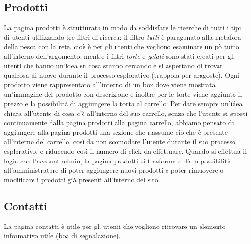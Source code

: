     \subsection{Prodotti}
		La pagina prodotti è strutturata in modo da soddisfare le ricerche di tutti i tipi di utenti utilizzando tre filtri di ricerca:
		il filtro \emph{tutti} è paragonato alla metafora della pesca con la rete, cioè è per gli utenti che vogliono esaminare un pò tutto all’interno dell’argomento;
		mentre i filtri \emph{torte} e \emph{gelati}  sono stati creati per gli utenti che hanno un’idea su cosa stanno cercando e si aspettano di trovar qualcosa di nuovo durante il processo esplorativo (trappola per aragoste).
		Ogni prodotto viene rappresentato all’interno di un box dove viene mostrata un’immagine del prodotto con descrizione e inoltre per le torte viene aggiunto il prezzo e la possibilità di aggiungere la torta al carrello:
		Per dare sempre un’idea chiara all’utente di cosa c’è all’interno del suo carrello, senza che l’utente si sposti continuamente dalla pagina prodotti alla pagina carrello, abbiamo pensato di aggiungere alla pagina prodotti una sezione che riassume ciò che è presente all’interno del carrello, così da non scomodare l’utente durante il suo processo esplorativo, e riducendo così il numero di click da effettuare.
		Quando si effettua il login con l'account admin, la pagina prodotti si trasforma e dà la possibilità all’amministratore di poter aggiungere nuovi prodotti e poter rimuovere o modificare i prodotti già presenti all’interno del sito.
    \subsection{Contatti}
		La pagina contatti è utile per gli utenti che vogliono ritrovare un elemento informativo utile (boa di segnalazione).
